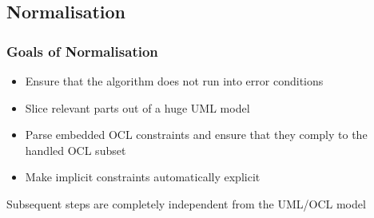 \documentclass{beamer}
\begin{document}
\subsection{Normalisation}
\begin{frame}
\frametitle{Goals of Normalisation}
\begin{itemize}
  \item Ensure that the algorithm does not run into error conditions
  \item Slice relevant parts out of a huge UML model
  \item Parse embedded OCL constraints and ensure that they comply to the handled OCL subset
  \item Make implicit constraints automatically explicit
\end{itemize}
\begin{block}{}
Subsequent steps are completely independent from the UML/OCL model
\end{block}
\end{frame}
\end{document}
